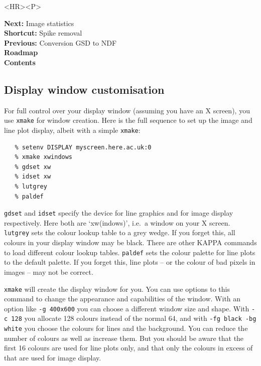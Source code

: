 \documentclass[11pt]{article}
\newcommand{\htmlref}[2]{#1}
\newcommand{\xref}[3]{#1}
\newcommand{\xlabel}[1]{}
\begin{document}
\begin{htmlonly}
\begin{rawhtml} <HR><P> \end{rawhtml}
{\bf \htmlref{Next:}{stats}} Image statistics\\
{\bf \htmlref{Shortcut:}{spikes}} Spike removal\\
{\bf \htmlref{Previous:}{gsd2ndf}} Conversion GSD to NDF\\
{\bf \htmlref{Roadmap}{roadmap}}\\
{\bf \htmlref{Contents}{stardoccontents}}\\
\end{htmlonly}


\subsection{\label{xmake}\xlabel{xmake}Display window customisation}

   For full control over your display window (assuming you have an X
   screen), you use {\tt xmake} for window creation. Here is the full
   sequence to set up the image and line plot display, albeit with a
   simple {\tt xmake}:

\begin{verbatim}
   % setenv DISPLAY myscreen.here.ac.uk:0
   % xmake xwindows
   % gdset xw
   % idset xw
   % lutgrey
   % paldef
\end{verbatim}

{\tt \xref{gdset}{sun95}{GDSET}}
   and
{\tt \xref{idset}{sun95}{IDSET}}
   specify the device for line graphics and for image display respectively.
   Here both are `xw(indows)', i.e.\ a window on your X screen.
{\tt \xref{lutgrey}{sun95}{LUTGREY}}
   sets the colour lookup table to a grey wedge. If
   you forget this, all colours in your display window may be black.
   There are other KAPPA commands to
\xref{load different colour lookup tables.}{sun95}{se_coltab}
{\tt \xref{paldef}{sun95}{PALDEF}}
   sets the colour palette for line plots to the default palette. If
   you forget this, line plots -- or the colour of bad pixels in images --
   may not be correct.

{\tt \xref{xmake}{sun130}{xmakeCommand}}
   will create the display window for you. You can use options to this
   command to change the appearance and capabilities of the window. With
   an option like {\tt -g 400x600} you can choose a different window
   size and shape. With {\tt -c 128} you allocate 128 colours instead
   of the normal 64, and with {\tt -fg black -bg white} you choose
   the colours for lines and the background. You can reduce the number
   of colours as well as increase them. But you should be aware that
   the first 16 colours are used for line plots only, and that only the
   colours in excess of that are used for image display.
\end{document}
